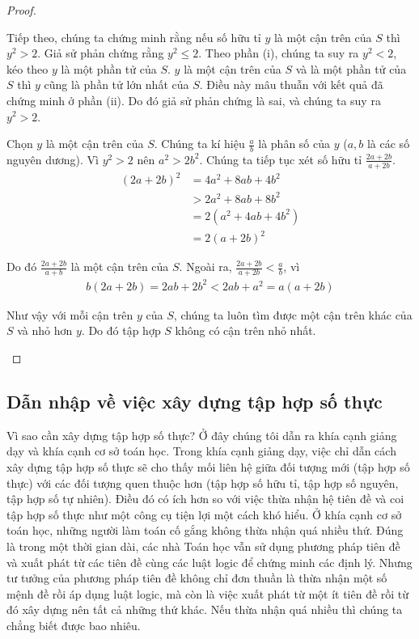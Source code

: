 \begin{proof}
\begin{enumerate}[label={(\roman*)}]
              Tiếp theo, chúng ta chứng minh rằng nếu số hữu tỉ $y$ là một cận trên của $S$ thì $y^{2} > 2$. Giả sử phản chứng rằng $y^{2}\leq 2$. Theo phần (i), chúng ta suy ra $y^{2} < 2$, kéo theo $y$ là một phần tử của $S$. $y$ là một cận trên của $S$ và là một phần tử của $S$ thì $y$ cũng là phần tử lớn nhất của $S$. Điều này mâu thuẫn với kết quả đã chứng minh ở phần (ii). Do đó giả sử phản chứng là sai, và chúng ta suy ra $y^{2} > 2$.

              Chọn $y$ là một cận trên của $S$. Chúng ta kí hiệu $\frac{a}{b}$ là phân số của $y$ ($a, b$ là các số nguyên dương). Vì $y^{2} > 2$ nên $a^{2} > 2b^{2}$. Chúng ta tiếp tục xét số hữu tỉ $\frac{2a + 2b}{a + 2b}$.
              \begin{align*}
                  {(2a + 2b)}^{2} & = 4a^{2} + 8ab + 4b^{2}   \\
                                  & > 2a^{2} + 8ab + 8b^{2}   \\
                                  & = 2(a^{2} + 4ab + 4b^{2}) \\
                                  & = 2{(a + 2b)}^{2}
              \end{align*}

              Do đó $\frac{2a + 2b}{a + b}$ là một cận trên của $S$. Ngoài ra, $\frac{2a + 2b}{a + 2b} < \frac{a}{b}$, vì
              \begin{align*}
                  b(2a + 2b) = 2ab + 2b^{2} < 2ab + a^{2} = a(a + 2b)
              \end{align*}

              Như vậy với mỗi cận trên $y$ của $S$, chúng ta luôn tìm được một cận trên khác của $S$ và nhỏ hơn $y$. Do đó tập hợp $S$ không có cận trên nhỏ nhất.
    \end{enumerate}
\end{proof}

\subsection{Dẫn nhập về việc xây dựng tập hợp số thực}

Vì sao cần xây dựng tập hợp số thực? Ở đây chúng tôi dẫn ra khía cạnh giảng dạy và khía cạnh cơ sở toán học. Trong khía cạnh giảng dạy, việc chỉ dẫn cách xây dựng tập hợp số thực sẽ cho thấy mối liên hệ giữa đối tượng mới (tập hợp số thực) với các đối tượng quen thuộc hơn (tập hợp số hữu tỉ, tập hợp số nguyên, tập hợp số tự nhiên). Điều đó có ích hơn so với việc thừa nhận hệ tiên đề và coi tập hợp số thực như một công cụ tiện lợi một cách khó hiểu. Ở khía cạnh cơ sở toán học, những người làm toán cố gắng không thừa nhận quá nhiều thứ. Đúng là trong một thời gian dài, các nhà Toán học vẫn sử dụng phương pháp tiên đề và xuất phát từ các tiên đề cùng các luật logic để chứng minh các định lý. Nhưng tư tưởng của phương pháp tiên đề không chỉ đơn thuần là thừa nhận một số mệnh đề rồi áp dụng luật logic, mà còn là việc xuất phát từ một ít tiên đề rồi từ đó xây dựng nên tất cả những thứ khác. Nếu thừa nhận quá nhiều thì chúng ta chẳng biết được bao nhiêu.

